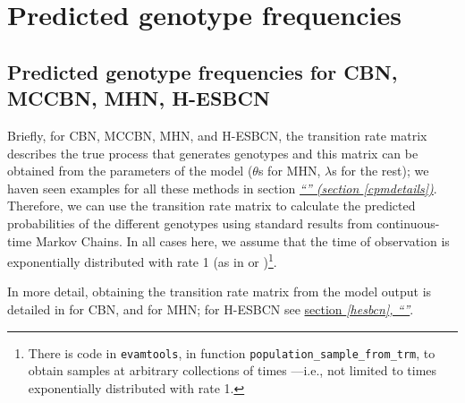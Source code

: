 \documentclass[a4paper,11pt]{article}
\newcommand*{\qref}[1]{\hyperref[{#1}]{\textit{``\nameref*{#1}'' (section \ref*{#1})}}}
\newcommand*{\qrefP}[1]{\hyperref[{#1}]{\textit{``\nameref*{#1}'', section \ref*{#1}}}}
\newcommand*{\qrefS}[1]{\hyperref[{#1}]{section \textit{\ref*{#1},
      ``\nameref*{#1}''}}}
\begin{document}




\section{Predicted genotype frequencies}
\label{pred-gen-freq}

\subsection{Predicted genotype frequencies for CBN, MCCBN, MHN, H-ESBCN}
\label{predicted-cbn-et-al}

Briefly, for CBN, MCCBN, MHN, and H-ESBCN, the transition rate matrix describes the true process that generates genotypes and this matrix can be obtained from the parameters of the model ($\theta$s for MHN, $\lambda$s for the rest); we haven seen examples for all these methods in section \qref{cpmdetails}. Therefore, we can use the transition rate matrix to calculate the predicted probabilities of the different genotypes using standard results from continuous-time Markov Chains. In all cases here, we assume that the time of observation is exponentially distributed with rate 1 (as in \citealp{gerstung2009quantifying} or \citealp{schill2020modelling})\footnote{There is code in \texttt{evamtools}, in function \texttt{population\_sample\_from\_trm}, to obtain samples at arbitrary collections of times ---i.e., not limited to  times exponentially distributed  with rate 1.}.


In more detail, obtaining the transition rate matrix from the model output is detailed in \cite{montazeri2016large} for CBN, and \cite{schill2020modelling} for MHN; for H-ESBCN see \qrefS{hesbcn}.
\end{document}
